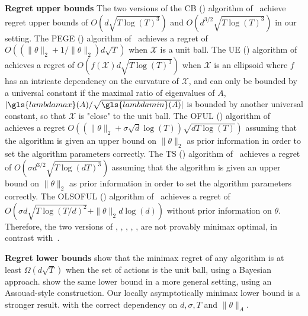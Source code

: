 \textbf{Regret upper bounds } The two versions of the \gls{CB} () algorithm of~\cite{dani_stochastic_2008} achieve regret upper bounds of $O( d \sqrt{ T \log(T)^{3} })$ and $O( d^{3/2} \sqrt{ T \log(T)^{3} })$ in our setting.
The \gls{PEGE} () algorithm of~\cite{rusmi_linearly_2010} achieves a regret of $O( ( \|\theta\|_{2} + 1/\|\theta\|_{2} ) d \sqrt{T})$ when $\mathcal{X}$ is a unit ball. 
The \gls{UE} ()  algorithm of \cite{rusmi_linearly_2010} achieves a regret of $O( f(\mathcal{X}) d \sqrt{T \log(T)^3})$ when $\mathcal{X}$ is an ellipsoid where $f$ has an intricate dependency on the curvature of $\mathcal{X}$, and can only be bounded by a universal constant if the maximal ratio of eigenvalues of $A$, $|\gls{lambdamax}(A)/\sqrt{\gls{lambdamin}(A)}|$ is bounded by another universal constant, so that $\mathcal{X}$ is "close" to the unit ball.
The \gls{OFUL} () algorithm of~\cite{abbasi2011improved} achieves a regret $O( (\|\theta\|_{2} + \sigma \sqrt{d} \log(T) ) \sqrt{d T \log(T)})$ assuming that the algorithm is given an upper bound on $\|\theta\|_{2}$ as prior information in order to set the algorithm parameters correctly. 
The \gls{TS} () algorithm of~\cite{abeille_2017} achieves a regret of $O( \sigma d^{3/2}\sqrt{T \log(dT)^3 })$ assuming that the algorithm is given an upper bound on $\|\theta\|_{2}$ as prior information in order to set the algorithm parameters correctly. 
The \gls{OLSOFUL} () algorithm of~\cite{gales2022norm-agn} achieves a regret of $O( \sigma d \sqrt{ T \log(T/d)^2 } + \|\theta\|_{2}d \log(d) )$ without prior information on $\theta$. 
Therefore, the two versions of , , , , ,   are not provably minimax optimal, in contrast with~\nous.

\textbf{Regret lower bounds } \cite{rusmi_linearly_2010} show that the minimax regret of any algorithm is at least $\Omega(d \sqrt{T})$ when the set of actions is the unit ball, using a Bayesian approach. 
\cite{lattimore_bandit_2020} show the same lower bound in a more general setting, using an Assouad-style construction. 
Our locally asymptotically minimax lower bound is a stronger result. with the correct
dependency on $d, \sigma, T$ and $\|\theta\|_{A}$. 

